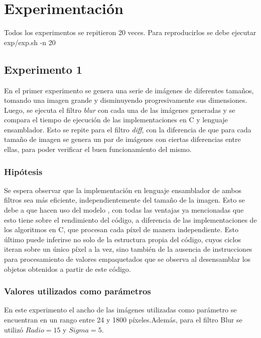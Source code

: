 \section{Experimentación}
	Todos los experimentos se repitieron 20 veces. Para reproducirlos se debe ejecutar exp/exp.sh -n 20  

	\subsection{Experimento 1}
		En el primer experimento se genera una serie de imágenes de diferentes tamaños, tomando una imagen grande y disminuyendo progresivamente sus dimensiones.
		Luego, se ejecuta el filtro \emph{blur} con cada una de las imágenes generadas y se compara el tiempo de ejecución de las implementaciones en C y lenguaje ensamblador.
		Esto se repite para el filtro \emph{diff}, con la diferencia de que para cada tamaño de imagen se genera 
		un par de imágenes con ciertas diferencias entre ellas, para poder verificar el buen funcionamiento del mismo.

		\subsubsection*{Hipótesis} 
			Se espera observar que la implementación en lenguaje ensamblador de ambos filtros sea más eficiente, independientemente del tamaño de la imagen. Esto se debe a que hacen uso del modelo , con todas las ventajas ya mencionadas que esto tiene sobre el rendimiento del código, a diferencia de las implementaciones de los algoritmos en C, que procesan cada píxel de manera independiente. Esto último puede inferirse no solo de la estructura propia del código, cuyos ciclos iteran sobre un único píxel a la vez, sino también de la ausencia de instrucciones  para procesamiento de valores empaquetados que se observa al desensamblar los objetos obtenidos a partir de este código.

		\subsubsection*{Valores utilizados como parámetros} 		
			En este experimento el ancho de las imágenes utilizadas como parámetro se encuentran en un rango entre 24 y 1800 píxeles.Además, para el filtro Blur se utilizó $Radio = 15$ y $Sigma = 5$.

